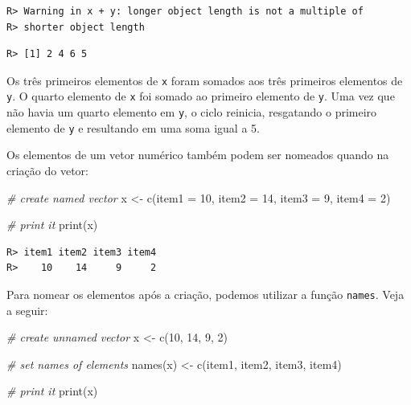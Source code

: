 \documentclass[
  11pt,
]{book}
\newenvironment{Shaded}{\begin{snugshade}}{\end{snugshade}}
\newcommand{\AttributeTok}[1]{\textcolor[rgb]{0.61,0.61,0.61}{#1}}
\newcommand{\CommentTok}[1]{\textcolor[rgb]{0.37,0.37,0.37}{\textit{#1}}}
\newcommand{\DecValTok}[1]{\textcolor[rgb]{0.06,0.06,0.06}{#1}}
\newcommand{\FunctionTok}[1]{\textcolor[rgb]{0,0,0}{#1}}
\newcommand{\NormalTok}[1]{#1}
\newcommand{\OtherTok}[1]{\textcolor[rgb]{0.37,0.37,0.37}{#1}}
\newcommand{\StringTok}[1]{\textcolor[rgb]{0.5,0.5,0.5}{#1}}
\begin{document}
\begin{verbatim}
R> Warning in x + y: longer object length is not a multiple of
R> shorter object length
\end{verbatim}

\begin{verbatim}
R> [1] 2 4 6 5
\end{verbatim}

Os três primeiros elementos de \texttt{x} foram somados aos três primeiros elementos de \texttt{y}. O quarto elemento de \texttt{x} foi somado ao primeiro elemento de \texttt{y}. Uma vez que não havia um quarto elemento em \texttt{y}, o ciclo reinicia, resgatando o primeiro elemento de \texttt{y} e resultando em uma soma igual a 5.

Os elementos de um vetor numérico também podem ser nomeados quando na criação do vetor:

\begin{Shaded}
\begin{Highlighting}[]
\CommentTok{\# create named vector}
\NormalTok{x }\OtherTok{\textless{}{-}} \FunctionTok{c}\NormalTok{(}\AttributeTok{item1 =} \DecValTok{10}\NormalTok{,}
       \AttributeTok{item2 =} \DecValTok{14}\NormalTok{,}
       \AttributeTok{item3 =} \DecValTok{9}\NormalTok{,}
       \AttributeTok{item4 =} \DecValTok{2}\NormalTok{)}

\CommentTok{\# print it}
\FunctionTok{print}\NormalTok{(x)}
\end{Highlighting}
\end{Shaded}

\begin{verbatim}
R> item1 item2 item3 item4 
R>    10    14     9     2
\end{verbatim}

Para nomear os elementos após a criação, podemos utilizar a função \texttt{names}. Veja a seguir:

\begin{Shaded}
\begin{Highlighting}[]
\CommentTok{\# create unnamed vector}
\NormalTok{x }\OtherTok{\textless{}{-}} \FunctionTok{c}\NormalTok{(}\DecValTok{10}\NormalTok{, }\DecValTok{14}\NormalTok{, }\DecValTok{9}\NormalTok{, }\DecValTok{2}\NormalTok{)}

\CommentTok{\# set names of elements}
\FunctionTok{names}\NormalTok{(x) }\OtherTok{\textless{}{-}} \FunctionTok{c}\NormalTok{(}\StringTok{\textquotesingle{}item1\textquotesingle{}}\NormalTok{, }\StringTok{\textquotesingle{}item2\textquotesingle{}}\NormalTok{, }\StringTok{\textquotesingle{}item3\textquotesingle{}}\NormalTok{, }\StringTok{\textquotesingle{}item4\textquotesingle{}}\NormalTok{)}

\CommentTok{\# print it}
\FunctionTok{print}\NormalTok{(x)}
\end{Highlighting}
\end{Shaded}
\end{document}
